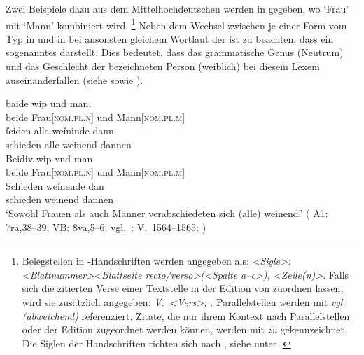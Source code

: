 Zwei Beispiele dazu aus dem Mittelhochdeutschen werden in
 gegeben, wo  `Frau' mit 
`Mann' kombiniert wird.%
%
	\footnote{Belegstellen in \KC{}-Handschriften werden angegeben als:
		\textit{<Sigle>: <Blattnummer><Blattseite recto/verso>(<Spalte a--c>),%
		<Zeile(n)>}. Falls sich die zitierten Verse einer Textstelle in der
		Edition von \citet{schroeder1895} zuordnen lassen, wird sie zusätzlich
		angegeben: \textit{V.~<Vers>; \cite[<Seite>]{schroeder1895}}.
		Parallelstellen werden mit \textit{vgl. (abweichend)} referenziert.
		Zitate, die nur ihrem Kontext nach Parallelstellen oder der Edition
		zugeordnet werden können, werden mit \textit{zu} gekennzeichnet. Die
		Siglen der Handschriften richten sich nach , siehe
		unter \nocite{kcdigital}.%
	}
%
Neben dem Wechsel zwischen je einer Form vom Typ  in
 und  in  bei
ansonsten gleichem Wortlaut der  ist zu beachten, dass
 ein sogenanntes  darstellt. Dies bedeutet,
dass das grammatische Genus (Neutrum) und das Geschlecht der bezeichneten
Person (weiblich) bei diesem Lexem auseinanderfallen (siehe
 sowie \cite[183--184]{corbett1991}).

\begin{exe}
\ex \label{ex:mhgbeideunde}
	\begin{xlist}
	\ex \label{ex:mhgbeideunde_1}
		\gll baide wip und man. \\
			beide Frau[\textsc{nom.pl.n}] und Mann[\textsc{nom.pl.m}] \\
	\sn \gll ſciden alle weíninde dann. \\
			schieden alle weinend dannen \\

	\ex \label{ex:mhgbeideunde_2}
		\gll Beidiv wip vnd man \\
			beide Frau[\textsc{nom.pl.n}] und Mann[\textsc{nom.pl.m}] \\
	\sn \gll Schieden weínende dan \\
			schieden weinend dannen \\
		\trans `Sowohl Frauen als auch Männer verabschiedeten sich (alle)
			weinend.'
			(%
				A1: 7ra,38--39;
				VB: 8va,5--6;
				vgl.~\KC: V.~1564--1565; \cite[110]{schroeder1895}%
			)
	\end{xlist}
\end{exe}

